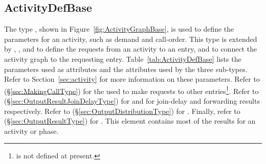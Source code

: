 \subsection{ActivityDefBase}
\label{sec:ActivityDefBase}

The type , shown in Figure~\ref{fig:ActivityGraphBase}, is used to define the
parameters for an activity, such as demand and call-order.  This type is
extended by , , and
 to define the requests from an activity to an entry, and to
connect the activity graph to the requesting entry.
Table~\ref{tab:ActivityDefBase} lists the parameters used as attributes and the attributes used by the three
sub-types.  Refer to Section~\ref{sec:activity} for more information on these parameters.  Refer to
 (\S\ref{sec:MakingCallType}) for the  used to
make requests to other entries\footnote{ is not defined at present.}. Refer
to  (\S\ref{sec:OutputResultJoinDelayType}) for
 and  for join-delay and
forwarding results respectively.  Refer to 
(\S\ref{sec:OutputDistributionType}) for .  Finally, refer to
 (\S\ref{sec:OutputResultType}) for .  This
element contains most of the results for an activity or
phase.

